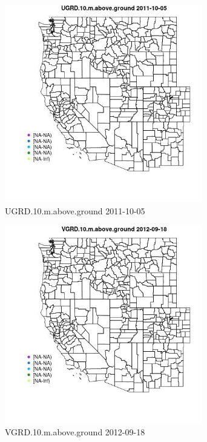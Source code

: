 \begin{figure} 
\centering  
\includegraphics[width=0.77\textwidth]{Code_Outputs/ML_input_report_ML_input_PM25_Step5_part_d_de_duplicated_aves_ML_input_MapObsUGRD10maboveground2011-10-05.jpg} 
\caption{\label{fig:ML_input_report_ML_input_PM25_Step5_part_d_de_duplicated_aves_ML_inputMapObsUGRD10maboveground2011-10-05}UGRD.10.m.above.ground 2011-10-05} 
\end{figure} 
 

\begin{figure} 
\centering  
\includegraphics[width=0.77\textwidth]{Code_Outputs/ML_input_report_ML_input_PM25_Step5_part_d_de_duplicated_aves_ML_input_MapObsVGRD10maboveground2012-09-18.jpg} 
\caption{\label{fig:ML_input_report_ML_input_PM25_Step5_part_d_de_duplicated_aves_ML_inputMapObsVGRD10maboveground2012-09-18}VGRD.10.m.above.ground 2012-09-18} 
\end{figure} 
 

